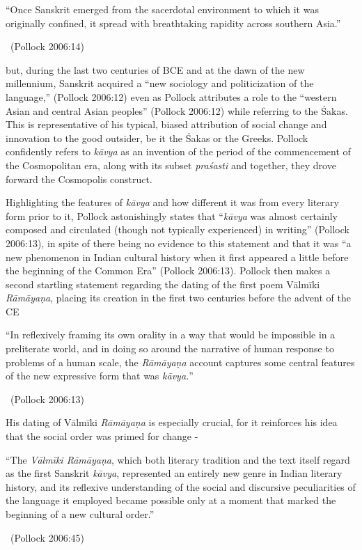 \begin{myquote}
“Once Sanskrit emerged from the sacerdotal environment to which it was originally confined, it spread with breathtaking rapidity across southern Asia.” 

~\hfill (Pollock 2006:14)
\end{myquote}

but, during the last two centuries of BCE and at the dawn of the new millennium, Sanskrit acquired a “new sociology and politicization of the language,” (Pollock 2006:12) even as Pollock attributes a role to the “western Asian and central Asian peoples” (Pollock 2006:12) while referring to the Śakas. This is representative of his typical, biased attribution of social change and innovation to the good outsider, be it the Śakas or the Greeks. Pollock confidently refers to \textit{kāvya} as an invention of the period of the commencement of the Cosmopolitan era, along with its subset \textit{praśasti} and together, they drove forward the Cosmopolis construct.

Highlighting the features of \textit{kāvya} and how different it was from every literary form prior to it, Pollock astonishingly states that “\textit{kāvya} was almost certainly composed and circulated (though not typically experienced) in writing” (Pollock 2006:13), in spite of there being no evidence to this statement and that it was “a new phenomenon in Indian cultural history when it first appeared a little before the beginning of the Common Era” (Pollock 2006:13). Pollock then makes a second startling statement regarding the dating of the first poem Vālmīki \textit{Rāmāyaṇa}, placing its creation in the first two centuries before the advent of the CE

\begin{myquote}
“In reflexively framing its own orality in a way that would be impossible in a preliterate world, and in doing so around the narrative of human response to problems of a human scale, the \textit{Rāmāyaṇa} account captures some central features of the new expressive form that was \textit{kāvya.}” 

~\hfill (Pollock 2006:13)
\end{myquote}

His dating of Vālmīki \textit{Rāmāyaṇa} is especially crucial, for it reinforces his idea that the social order was primed for change -

\begin{myquote}
“The \textit{Vālmīki Rāmāyaṇa}, which both literary tradition and the text itself regard as the first Sanskrit \textit{kāvya}, represented an entirely new genre in Indian literary history, and its reflexive understanding of the social and discursive peculiarities of the language it employed became possible only at a moment that marked the beginning of a new cultural order.” 

~\hfill (Pollock 2006:45)
\end{myquote}

